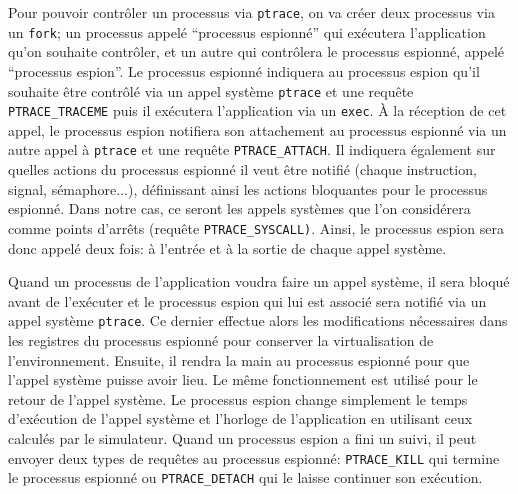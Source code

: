 Pour pouvoir contrôler un processus via \texttt{ptrace}, on va créer deux
processus via un \texttt{fork}; un processus appelé ``processus espionné'' qui
exécutera l'application qu'on souhaite contrôler, et un autre qui contrôlera le
processus espionné, appelé ``processus espion''. Le processus espionné indiquera
au processus espion qu'il souhaite être contrôlé via un appel
système \texttt{ptrace} et une requête \texttt{PTRACE\_TRACEME} puis il
exécutera l'application via un \texttt{exec}. À la réception de cet appel, le
processus espion notifiera son attachement au processus espionné via un autre
appel à \texttt{ptrace} et une requête \texttt{PTRACE\_ATTACH}. Il indiquera
également sur quelles actions du processus espionné il veut être notifié (chaque
instruction, signal, sémaphore...), définissant ainsi les actions bloquantes
pour le processus espionné. Dans notre cas, ce seront les appels systèmes que
l'on considérera comme points d'arrêts (requête
\texttt{PTRACE\_SYSCALL)}. Ainsi, le processus espion sera donc appelé deux
fois: à l'entrée et à la sortie de chaque appel système.

Quand un processus de l'application voudra faire un appel système, il sera
bloqué avant de l'exécuter et le processus espion qui lui est associé sera
notifié via un appel système \texttt{ptrace}. Ce dernier effectue alors les
modifications nécessaires dans les registres du processus espionné pour
conserver la virtualisation de l'environnement. Ensuite, il rendra la main au
processus espionné pour que l'appel système puisse avoir lieu. Le même
fonctionnement est utilisé pour le retour de l'appel système. Le processus
espion change simplement le temps d'exécution de l'appel système et l'horloge de
l'application en utilisant ceux calculés par le simulateur. Quand un processus
espion a fini un suivi, il peut envoyer deux types de requêtes au processus
espionné: \texttt{PTRACE\_KILL} qui termine le processus espionné
ou \texttt{PTRACE\_DETACH} qui le laisse continuer son exécution.

